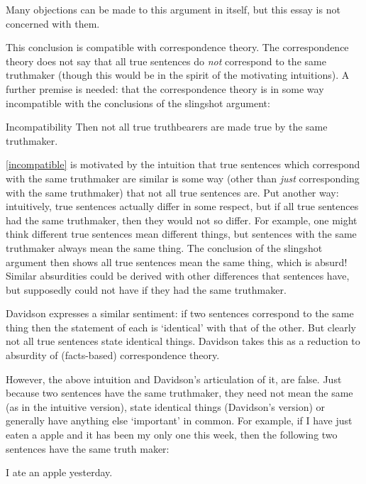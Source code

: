 Many objections can be made to this argument in itself, but this essay is not concerned with them.

This conclusion is compatible with correspondence theory.
The correspondence theory does not say that all true sentences do \emph{not} correspond to the same truthmaker (though this would be in the spirit of the motivating intuitions).
A further premise is needed: that the correspondence theory is in some way incompatible with the conclusions of the slingshot argument:

	\begin{principle}{Incompatibility} \label{incompatible}
	Then not all true truthbearers are made true by the same truthmaker.
	\end{principle}

\ref{incompatible} is motivated by the intuition that true sentences which correspond with the same truthmaker are similar is some way (other than \emph{just} corresponding with the same truthmaker) that not all true sentences are.
Put another way: intuitively, true sentences actually differ in some respect, but if all true sentences had the same truthmaker, then they would not so differ.
For example, one might think different true sentences mean different things, but sentences with the same truthmaker always mean the same thing.
The conclusion of the slingshot argument then shows all true sentences mean the same thing, which is absurd!
Similar absurdities could be derived with other differences that sentences have, but supposedly could not have if they had the same truthmaker.

Davidson expresses a similar sentiment: if two sentences correspond to the same thing then the statement of each is `identical' with that of the other.
But clearly not all true sentences state identical things.
Davidson takes this as a reduction to absurdity of (facts-based) correspondence theory.
\parencite[750]{Davidson_1969}

However, the above intuition and Davidson's articulation of it, are false.
Just because two sentences have the same truthmaker, they need not mean the same (as in the intuitive version), state identical things (Davidson's version) or generally have anything else `important' in common.
For example, if I have just eaten a apple and it has been my only one this week, then the following two sentences have the same truth maker:

	\begin{example} \label{yesterday}
	I ate an apple yesterday.
	\end{example}

